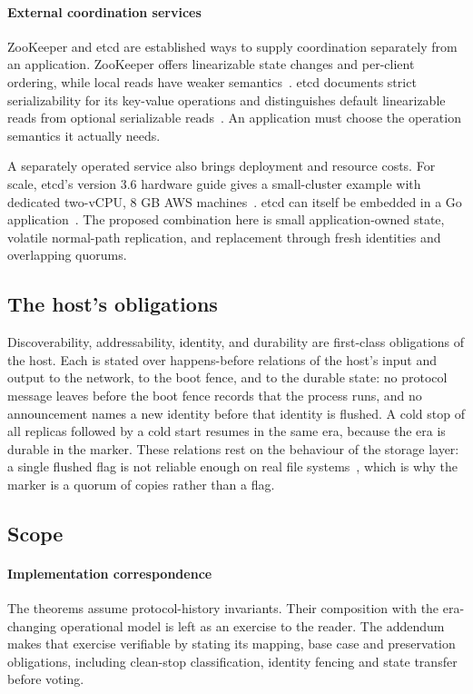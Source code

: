 \documentclass[10pt,journal,letterpaper]{IEEEtran}
\begin{document}
\paragraph{External coordination services}
ZooKeeper and etcd are established ways to supply coordination separately from an application. ZooKeeper offers linearizable state changes and per-client ordering, while local reads have weaker semantics~\cite{zookeeper}. etcd documents strict serializability for its key-value operations and distinguishes default linearizable reads from optional serializable reads~\cite{etcd-guarantees}. An application must choose the operation semantics it actually needs.

A separately operated service also brings deployment and resource costs. For scale, etcd's version 3.6 hardware guide gives a small-cluster example with dedicated two-vCPU, 8 GB AWS machines~\cite{etcd-hardware}. etcd can itself be embedded in a Go application~\cite{etcd-embed}. The proposed combination here is small application-owned state, volatile normal-path replication, and replacement through fresh identities and overlapping quorums.

\subsection{The host's obligations}
Discoverability, addressability, identity, and durability are first-class
obligations of the host. Each is stated over happens-before relations of the
host's input and output to the network, to the boot fence, and to the durable
state: no protocol message leaves before the boot fence records that the
process runs, and no announcement names a new identity before that identity is
flushed. A cold stop of all replicas followed by a cold start resumes in the
same era, because the era is durable in the marker. These relations rest on the
behaviour of the storage layer: a single flushed flag is not reliable enough on
real file systems~\cite{allfs,optimistic-crash}, which is why the marker is a
quorum of copies rather than a flag.

\subsection{Scope}
\paragraph{Implementation correspondence}
The theorems assume protocol-history invariants. Their composition with the era-changing operational model is left as an exercise to the reader. The addendum~\cite{artifact} makes that exercise verifiable by stating its mapping, base case and preservation obligations, including clean-stop classification, identity fencing and state transfer before voting.
\end{document}
